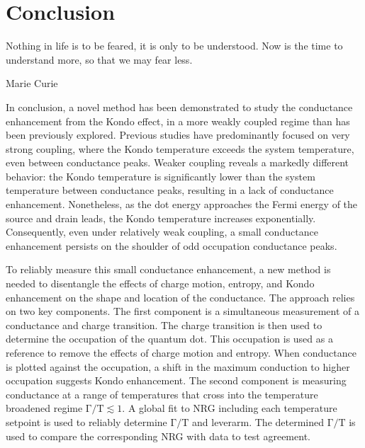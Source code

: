 \chapter{Conclusion}\label{cha:conclusion}


\epigraph{Nothing in life is to be feared, it is only to be understood. Now is the time to understand more, so that we may fear less.}{Marie Curie}

In conclusion, a novel method has been demonstrated to study the conductance enhancement from the Kondo effect, in a more weakly coupled regime than has been previously explored. 
Previous studies have predominantly focused on very strong coupling, where the Kondo temperature exceeds the system temperature, even between conductance peaks.
Weaker coupling reveals a markedly different behavior: the Kondo temperature is significantly lower than the system temperature between conductance peaks, resulting in a lack of conductance enhancement.
Nonetheless, as the dot energy approaches the Fermi energy of the source and drain leads, the Kondo temperature increases exponentially. 
Consequently, even under relatively weak coupling, a small conductance enhancement persists on the shoulder of odd occupation conductance peaks.




To reliably measure this small conductance enhancement, a new method is needed to disentangle the effects of charge motion, entropy, and Kondo enhancement on the shape and location of the conductance. 
The approach relies on two key components. 
The first component is a simultaneous measurement of a conductance and charge transition. The charge transition is then used to determine the occupation of the quantum dot. This occupation is used as a reference to remove the effects of charge motion and entropy. When conductance is plotted against the occupation, a shift in the maximum conduction to higher occupation suggests Kondo enhancement. 
The second component is measuring conductance at a range of temperatures that cross into the temperature broadened regime $\mathrm{\Gamma/T} \lesssim 1$. A global fit to NRG including each temperature setpoint is used to reliably determine $\mathrm{\Gamma/T}$ and leverarm. The determined $\mathrm{\Gamma/T}$ is used to compare the corresponding NRG with data to test agreement. 

